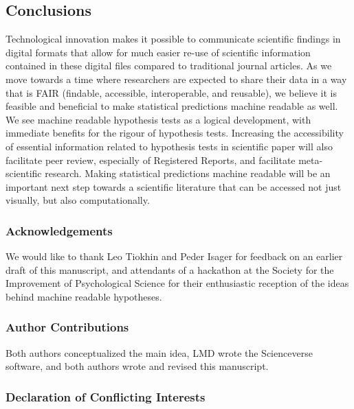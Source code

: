 \documentclass[english,doc,floatsintext]{apa6}
\begin{document}
\hypertarget{conclusions}{%
\subsection{Conclusions}\label{conclusions}}

Technological innovation makes it possible to communicate scientific findings in digital formats that allow for much easier re-use of scientific information contained in these digital files compared to traditional journal articles. As we move towards a time where researchers are expected to share their data in a way that is FAIR (findable, accessible, interoperable, and reusable), we believe it is feasible and beneficial to make statistical predictions machine readable as well. We see machine readable hypothesis tests as a logical development, with immediate benefits for the rigour of hypothesis tests. Increasing the accessibility of essential information related to hypothesis tests in scientific paper will also facilitate peer review, especially of Registered Reports, and facilitate meta-scientific research. Making statistical predictions machine readable will be an important next step towards a scientific literature that can be accessed not just visually, but also computationally.

\newpage

\hypertarget{acknowledgements}{%
\subsubsection{Acknowledgements}\label{acknowledgements}}

We would like to thank Leo Tiokhin and Peder Isager for feedback on an earlier draft of this manuscript, and attendants of a hackathon at the Society for the Improvement of Psychological Science for their enthusiastic reception of the ideas behind machine readable hypotheses.

\hypertarget{author-contributions}{%
\subsubsection{Author Contributions}\label{author-contributions}}

Both authors conceptualized the main idea, LMD wrote the Scienceverse software, and both authors wrote and revised this manuscript.

\hypertarget{declaration-of-conflicting-interests}{%
\subsubsection{Declaration of Conflicting Interests}\label{declaration-of-conflicting-interests}}
\end{document}

